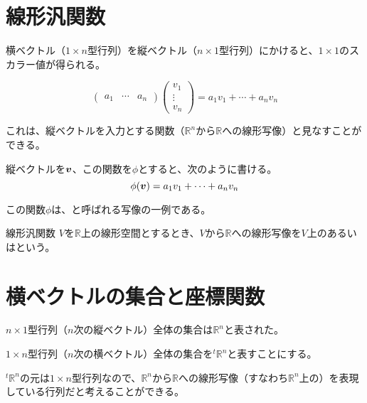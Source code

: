 \documentclass[../../../topic_linear-algebra]{subfiles}
\begin{document}
\sectionline
\section{線形汎関数}

横ベクトル（$1 \times n$型行列）を縦ベクトル（$n \times 1$型行列）にかけると、$1 \times 1$のスカラー値が得られる。

\begin{equation*}
  \begin{pmatrix}
    a_1 & \cdots & a_n
  \end{pmatrix} \begin{pmatrix}
    v_1    \\
    \vdots \\
    v_n
  \end{pmatrix}
  = a_1 v_1 + \cdots + a_n v_n
\end{equation*}

\br

これは、縦ベクトルを入力とする関数（$\mathbb{R}^n$から$\mathbb{R}$への線形写像）と見なすことができる。

縦ベクトルを$\vb*{v}$、この関数を$\phi$とすると、次のように書ける。
\begin{equation*}
  \phi(\vb*{v}) = a_1 v_1 + \cdots + a_n v_n
\end{equation*}

この関数$\phi$は、と呼ばれる写像の一例である。

\begin{definition}{線形汎関数}\label{def:linear-functional}
  $V$を$\mathbb{R}$上の線形空間とするとき、$V$から$\mathbb{R}$への線形写像を$V$上のあるいはという。
\end{definition}

\sectionline
\section{横ベクトルの集合と座標関数}

$n \times 1$型行列（$n$次の縦ベクトル）全体の集合は$\mathbb{R}^n$と表された。

$1 \times n$型行列（$n$次の横ベクトル）全体の集合を${}^t\mathbb{R}^n$と表すことにする。

\br

${}^t\mathbb{R}^n$の元は$1 \times n$型行列なので、$\mathbb{R}^n$から$\mathbb{R}$への線形写像（すなわち$\mathbb{R}^n$上の）を表現している行列だと考えることができる。
\end{document}
